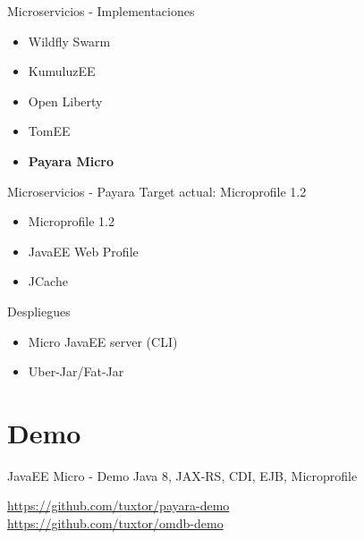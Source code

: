 \documentclass{beamer}
\begin{document}
\begin{frame}{Microservicios - Implementaciones}
\begin{itemize}
	\item Wildfly Swarm
	\item KumuluzEE
	\item Open Liberty
	\item TomEE
	\item \textbf{Payara Micro}
\end{itemize}
\end{frame}

\begin{frame}{Microservicios - Payara}
Target actual: Microprofile 1.2 

\begin{itemize}
	\item Microprofile 1.2 
	\item JavaEE Web Profile
	\item JCache
\end{itemize}

Despliegues
\begin{itemize}
	\item Micro JavaEE server (CLI)
	\item Uber-Jar/Fat-Jar
\end{itemize}
\end{frame}



\section{Demo}
\begin{frame}{JavaEE Micro  - Demo}
\huge Java 8, JAX-RS, CDI, EJB, Microprofile

\normalsize  \url{https://github.com/tuxtor/payara-demo}\\
\normalsize  \url{https://github.com/tuxtor/omdb-demo}
\end{frame}
\end{document}
